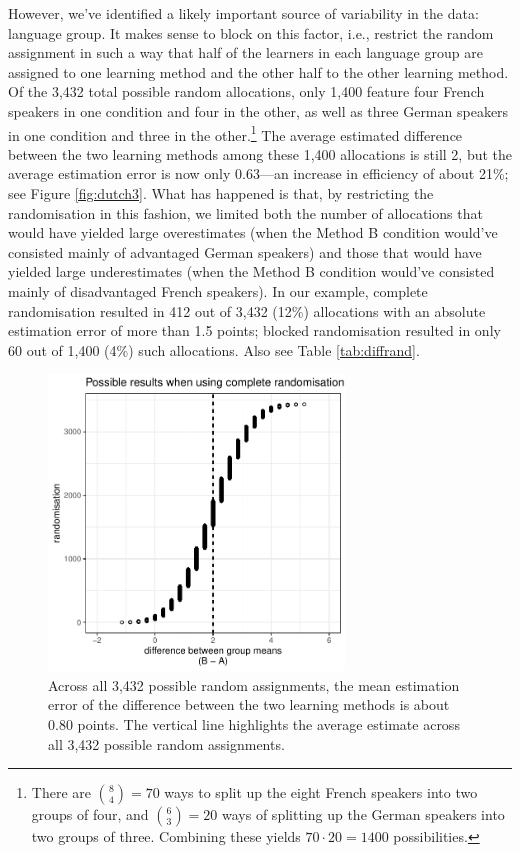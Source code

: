 \documentclass[a4paper]{tufte-book}\usepackage[]{graphicx}\usepackage[]{xcolor}
\begin{document}
However, we've identified a likely important source of variability in the data:
language group. It makes sense to block on this factor, i.e., restrict the
random assignment in such a way that half of the learners in each language group
are assigned to one learning method and the other half to the other learning method.
Of the 3,432 total possible random allocations, only 1,400 feature four French speakers
in one condition and four in the other, as well as three German speakers in one
condition and three in the other.\footnote{There are ${8 \choose 4} = 70$
ways to split up the eight French speakers into two groups of four, and
${6 \choose 3} = 20$ ways of splitting up the German speakers into two groups of three. Combining these yields $70 \cdot 20 = 1400$ possibilities.}
The average estimated difference between the two learning methods among these
1,400 allocations is still 2, but the average estimation error is now only 0.63---an increase
in efficiency of about 21\%;
see Figure \ref{fig:dutch3}.
What has happened is that, by restricting the randomisation
in this fashion, we limited both the number of allocations that would have yielded
large overestimates (when the Method B condition would've consisted mainly of
advantaged German speakers)
and those that would have yielded large underestimates (when the Method B condition would've consisted mainly of disadvantaged French speakers).
In our example, complete randomisation resulted in 412 out of 3,432 (12\%)
allocations with an absolute estimation error of more than 1.5 points;
blocked randomisation resulted in only 60 out of 1,400 (4\%) such allocations.
Also see Table \vref{tab:diffrand}.



\begin{figure}
  \centering
  \includegraphics[width = 0.7\textwidth]{figure/dutch2-1}
  \caption{Across all 3,432 possible random assignments, the mean estimation error of the difference between the two learning methods is about 0.80 points. The vertical line highlights the average estimate across all 3,432 possible random assignments.}
  \label{fig:dutch2}
\end{figure}
\end{document}
